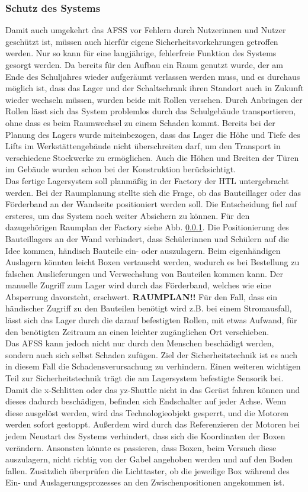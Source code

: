 \subsubsection{Schutz des Systems}
Damit auch umgekehrt das AFSS vor Fehlern durch Nutzerinnen und Nutzer geschützt ist, müssen auch hierfür eigene Sicherheitsvorkehrungen getroffen werden. Nur so kann für eine langjährige, fehlerfreie Funktion des Systems gesorgt werden.
Da bereits für den Aufbau ein Raum genutzt wurde, der am Ende des Schuljahres wieder aufgeräumt verlassen werden muss, und es durchaus möglich ist, dass das Lager und der Schaltschrank ihren Standort auch in Zukunft wieder wechseln müssen, wurden beide mit Rollen versehen. Durch Anbringen der Rollen lässt sich das System problemlos durch das Schulgebäude transportieren, ohne dass es beim Raumwechsel zu einem Schaden kommt. Bereits bei der Planung des Lagers wurde miteinbezogen, dass das Lager die Höhe und Tiefe des Lifts im Werkstättengebäude nicht überschreiten darf, um den Transport in verschiedene Stockwerke zu ermöglichen. Auch die Höhen und Breiten der Türen im Gebäude wurden schon bei der Konstruktion berücksichtigt.\\
Das fertige Lagersystem soll planmäßig in der Factory der HTL untergebracht werden. Bei der Raumplanung stellte sich die Frage, ob das Bauteillager oder das Förderband an der Wandseite positioniert werden soll. Die Entscheidung fiel auf ersteres, um das System noch weiter Absichern zu können. Für den dazugehörigen Raumplan der Factory siehe Abb. \ref{}. Die Positionierung des Bauteillagers an der Wand verhindert, dass Schülerinnen und Schülern auf die Idee kommen, händisch Bauteile ein- oder auszulagern. Beim eigenhändigen Auslagern könnten leicht Boxen vertauscht werden, wodurch es bei Bestellung zu falschen Auslieferungen und Verwechslung von Bauteilen kommen kann. Der manuelle Zugriff zum Lager wird durch das Förderband, welches wie eine Absperrung davorsteht, erschwert.
\textbf{RAUMPLAN!!}
Für den Fall, dass ein händischer Zugriff zu den Bauteilen benötigt wird z.B. bei einem Stromausfall, lässt sich das Lager durch die darauf befestigten Rollen, mit etwas Aufwand, für den benötigten Zeitraum an einen leichter zugänglichen Ort verschieben.\\
Das AFSS kann jedoch nicht nur durch den Menschen beschädigt werden, sondern auch sich selbst Schaden zufügen. Ziel der Sicherheitstechnik ist es auch in diesem Fall die Schadensverursachung zu verhindern. Einen weiteren wichtigen Teil zur Sicherheitstechnik trägt die am Lagersystem befestigte Sensorik bei. Damit die x-Schlitten oder das yz-Shuttle nicht in das Gerüst fahren können und dieses dadurch beschädigen, befinden sich Endschalter auf jeder Achse. Wenn diese ausgelöst werden, wird das Technologieobjekt gesperrt, und die Motoren werden sofort gestoppt. Außerdem wird durch das Referenzieren der Motoren bei jedem Neustart des Systems verhindert, dass sich die Koordinaten der Boxen verändern. Ansonsten könnte es passieren, dass Boxen, beim Versuch diese auszulagern, nicht richtig von der Gabel angehoben werden und auf den Boden fallen. Zusätzlich überprüfen die Lichttaster, ob die jeweilige Box während des Ein- und Auslagerungsprozesses an den Zwischenpositionen angekommen ist.\\
